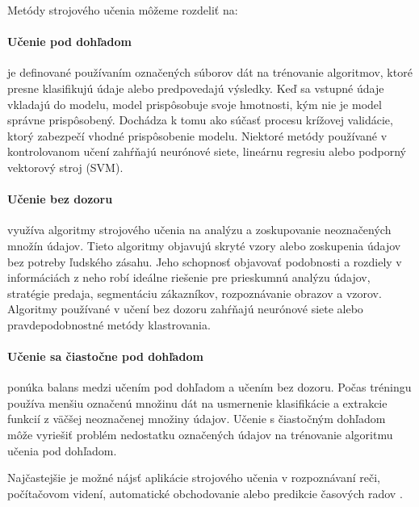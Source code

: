 Metódy strojového učenia môžeme rozdeliť na:
\paragraph{Učenie pod dohľadom} je definované používaním označených súborov dát na trénovanie algoritmov, ktoré presne klasifikujú údaje alebo predpovedajú výsledky. Keď sa vstupné údaje vkladajú do modelu, model prispôsobuje svoje hmotnosti, kým nie je model správne prispôsobený. Dochádza k tomu ako súčasť procesu krížovej validácie, ktorý zabezpečí vhodné prispôsobenie modelu. Niektoré metódy používané v kontrolovanom učení zahŕňajú neurónové siete, lineárnu regresiu alebo podporný vektorový stroj (SVM).

\paragraph{Učenie bez dozoru} využíva algoritmy strojového učenia na analýzu a zoskupovanie neoznačených množín údajov. Tieto algoritmy objavujú skryté vzory alebo zoskupenia údajov bez potreby ľudského zásahu. Jeho schopnosť objavovať podobnosti a rozdiely v informáciách z neho robí ideálne riešenie pre prieskumnú analýzu údajov, stratégie predaja, segmentáciu zákazníkov, rozpoznávanie obrazov a vzorov. Algoritmy používané v učení bez dozoru zahŕňajú neurónové siete alebo pravdepodobnostné metódy klastrovania.

\paragraph{Učenie sa čiastočne pod dohľadom} ponúka balans medzi učením pod dohľadom a učením bez dozoru. Počas tréningu používa menšiu označenú množinu dát na usmernenie klasifikácie a extrakcie funkcií z väčšej neoznačenej množiny údajov. Učenie s čiastočným dohľadom môže vyriešiť problém nedostatku označených údajov na trénovanie algoritmu učenia pod dohľadom.

Najčastejšie je možné nájsť aplikácie strojového učenia v rozpoznávaní reči, počítačovom videní, automatické obchodovanie alebo predikcie časových radov \cite{ai2}.

